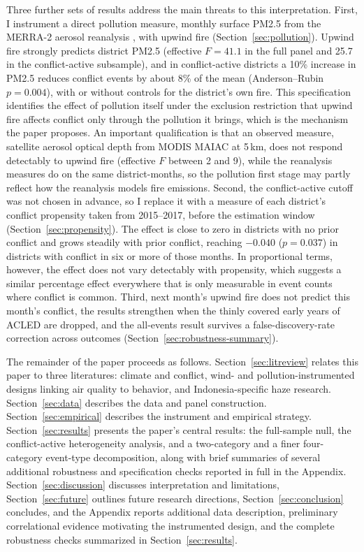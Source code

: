 \documentclass[12pt]{article}
\begin{document}
Three further sets of results address the main threats to this interpretation. First, I instrument a direct pollution measure, monthly surface PM2.5 from the MERRA-2 aerosol reanalysis \citep{gelaro2017merra}, with upwind fire (Section~\ref{sec:pollution}). Upwind fire strongly predicts district PM2.5 (effective $F = 41.1$ in the full panel and 25.7 in the conflict-active subsample), and in conflict-active districts a 10\% increase in PM2.5 reduces conflict events by about 8\% of the mean (Anderson--Rubin $p=0.004$), with or without controls for the district's own fire. This specification identifies the effect of pollution itself under the exclusion restriction that upwind fire affects conflict only through the pollution it brings, which is the mechanism the paper proposes. An important qualification is that an observed measure, satellite aerosol optical depth from MODIS MAIAC at 5\,km, does not respond detectably to upwind fire (effective $F$ between 2 and 9), while the reanalysis measures do on the same district-months, so the pollution first stage may partly reflect how the reanalysis models fire emissions. Second, the conflict-active cutoff was not chosen in advance, so I replace it with a measure of each district's conflict propensity taken from 2015--2017, before the estimation window (Section~\ref{sec:propensity}). The effect is close to zero in districts with no prior conflict and grows steadily with prior conflict, reaching $-0.040$ ($p=0.037$) in districts with conflict in six or more of those months. In proportional terms, however, the effect does not vary detectably with propensity, which suggests a similar percentage effect everywhere that is only measurable in event counts where conflict is common. Third, next month's upwind fire does not predict this month's conflict, the results strengthen when the thinly covered early years of ACLED are dropped, and the all-events result survives a false-discovery-rate correction across outcomes (Section~\ref{sec:robustness-summary}).

The remainder of the paper proceeds as follows. Section~\ref{sec:litreview} relates this paper to three literatures: climate and conflict, wind- and pollution-instrumented designs linking air quality to behavior, and Indonesia-specific haze research. Section~\ref{sec:data} describes the data and panel construction. Section~\ref{sec:empirical} describes the instrument and empirical strategy. Section~\ref{sec:results} presents the paper's central results: the full-sample null, the conflict-active heterogeneity analysis, and a two-category and a finer four-category event-type decomposition, along with brief summaries of several additional robustness and specification checks reported in full in the Appendix. Section~\ref{sec:discussion} discusses interpretation and limitations, Section~\ref{sec:future} outlines future research directions, Section~\ref{sec:conclusion} concludes, and the Appendix reports additional data description, preliminary correlational evidence motivating the instrumented design, and the complete robustness checks summarized in Section~\ref{sec:results}.
\end{document}
